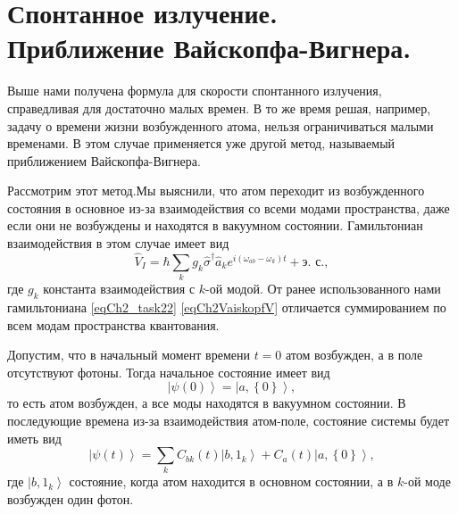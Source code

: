 \section{Спонтанное излучение. \\
  Приближение Вайскопфа-Вигнера.}
Выше нами получена формула для скорости спонтанного излучения,
справедливая для достаточно малых времен. В то же время решая,
например, задачу о времени жизни возбужденного атома, нельзя
ограничиваться малыми временами. В этом случае применяется уже другой
метод, называемый приближением Вайскопфа-Вигнера.

Рассмотрим этот метод.Мы выяснили, что атом переходит из возбужденного
состояния в основное из-за взаимодействия со всеми модами
пространства, даже если они не возбуждены и находятся в вакуумном
состоянии. Гамильтониан взаимодействия в этом случае имеет вид
\begin{equation}
\hat{V}_I = \hbar \sum_{k} g_k \hat{\sigma}^{\dag}\hat{a}_k e^{i\left(
\omega_{ab} - \omega_k
\right)t} + \mbox{э. с.},
\label{eqCh2VaiskopfV}
\end{equation}
где $g_k$ константа взаимодействия с $k$-ой модой. От ранее
использованного нами гамильтониана \eqref{eqCh2_task22}
\eqref{eqCh2VaiskopfV} отличается суммированием по всем модам
пространства квантования. 

Допустим, что в начальный момент времени $t=0$ атом возбужден, а в
поле отсутствуют фотоны. Тогда начальное состояние имеет вид
\begin{equation}
\left|\psi\left(0\right)\right> =
 \left|a, \left\{0\right\}\right>,
\nonumber
\end{equation}
то есть атом возбужден, а все моды находятся в вакуумном состоянии. В
последующие времена из-за взаимодействия атом-поле, состояние системы
будет иметь вид
\begin{equation}
\left|\psi\left(t\right)\right> =
\sum_{k} C_{bk}\left(t\right) \left|b, 1_k\right>
+
C_{a}\left(t\right) \left|a, \left\{0\right\}\right>,
\label{eqCh2Vaiskopf3}
\end{equation}
где $\left|b, 1_k\right>$ состояние, когда атом находится в основном
состоянии, а в $k$-ой моде возбужден один фотон. 

